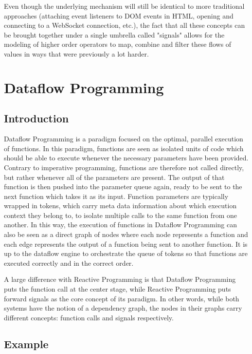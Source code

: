 Even though the underlying mechanism will still be identical to more traditional approaches (attaching event listeners to DOM events in HTML, opening and connecting to a WebSocket connection, etc.), the fact that all these concepts can be brought together under a single umbrella called "signals" allows for the modeling of higher order operators to map, combine and filter these flows of values in ways that were previously a lot harder.

\newpage
\section{Dataflow Programming}

\subsection{Introduction}

Dataflow Programming is a paradigm focused on the optimal, parallel execution of functions. In this paradigm, functions are seen as isolated units of code which should be able to execute whenever the necessary parameters have been provided. Contrary to imperative programming, functions are therefore not called directly, but rather whenever all of the parameters are present. 
The output of that function is then pushed into the parameter queue again, ready to be sent to the next function which takes it as its input. Function parameters are typically wrapped in tokens, which carry meta data information about which execution context they belong to, to isolate multiple calls to the same function from one another. 
In this way, the execution of functions in Dataflow Programming can also be seen as a direct graph of nodes where each node represents a function and each edge represents the output of a function being sent to another function. It is up to the dataflow engine to orchestrate the queue of tokens so that functions are executed correctly and in the correct order.

A large difference with Reactive Programming is that Dataflow Programming puts the function call at the center stage, while Reactive Programming puts forward signals as the core concept of its paradigm. In other words, while both systems have the notion of a dependency graph, the nodes in their graphs carry different concepts: function calls and signals respectively.
 

\subsection{Example}

